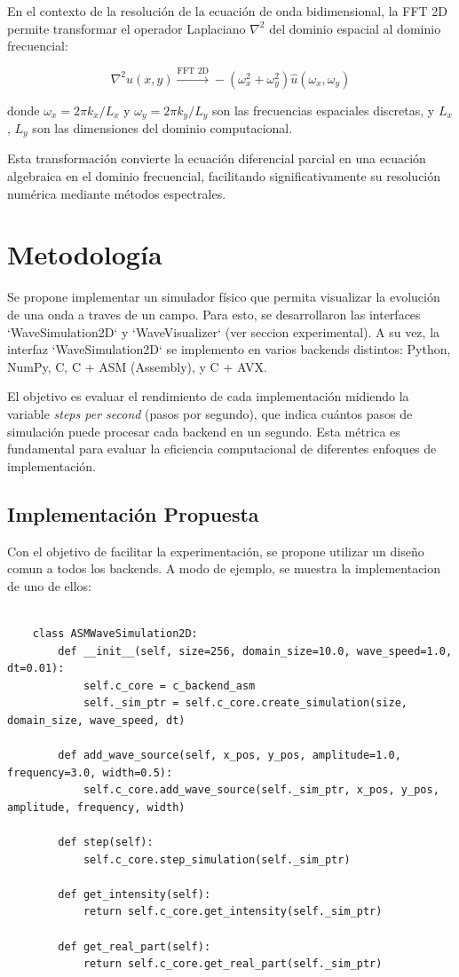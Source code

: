 \documentclass[a4paper]{article}
\begin{document}
En el contexto de la resolución de la ecuación de onda bidimensional, la FFT 2D permite transformar el operador Laplaciano $\nabla^2$
del dominio espacial al dominio frecuencial:

\begin{equation}
    \nabla^2 u(x,y) \xrightarrow{\text{FFT 2D}} -(\omega_x^2 + \omega_y^2) \hat{u}(\omega_x, \omega_y)
\end{equation}

donde $\omega_x = 2\pi k_x/L_x$ y $\omega_y = 2\pi k_y/L_y$ son las frecuencias espaciales discretas, y $L_x$, $L_y$ son las
dimensiones del dominio computacional.

Esta transformación convierte la ecuación diferencial parcial en una ecuación algebraica en el dominio frecuencial, facilitando
significativamente su resolución numérica mediante métodos espectrales.

\section{Metodología}
Se propone implementar un simulador físico que permita visualizar la evolución de una onda a traves de un campo. Para esto, se desarrollaron
las interfaces `WaveSimulation2D` y `WaveVisualizer` (ver seccion experimental). A su vez, la interfaz `WaveSimulation2D` se implemento en varios
backends distintos: Python, NumPy, C, C + ASM (Assembly), y C + AVX.

El objetivo es evaluar el rendimiento de cada implementación midiendo la variable \textit{steps per second} (pasos por segundo), que
indica cuántos pasos de simulación puede procesar cada backend en un segundo. Esta métrica es fundamental para evaluar la eficiencia
computacional de diferentes enfoques de implementación.

\subsection{Implementación Propuesta}
Con el objetivo de facilitar la experimentación, se propone utilizar un diseño comun a todos los backends. A modo de ejemplo, se muestra
la implementacion de uno de ellos:

\begin{verbatim}
    
    class ASMWaveSimulation2D:
        def __init__(self, size=256, domain_size=10.0, wave_speed=1.0, dt=0.01):
            self.c_core = c_backend_asm
            self._sim_ptr = self.c_core.create_simulation(size, domain_size, wave_speed, dt)
        
        def add_wave_source(self, x_pos, y_pos, amplitude=1.0, frequency=3.0, width=0.5):
            self.c_core.add_wave_source(self._sim_ptr, x_pos, y_pos, amplitude, frequency, width)
        
        def step(self):
            self.c_core.step_simulation(self._sim_ptr)
        
        def get_intensity(self):
            return self.c_core.get_intensity(self._sim_ptr)
        
        def get_real_part(self):
            return self.c_core.get_real_part(self._sim_ptr)
\end{verbatim}
\end{document}
